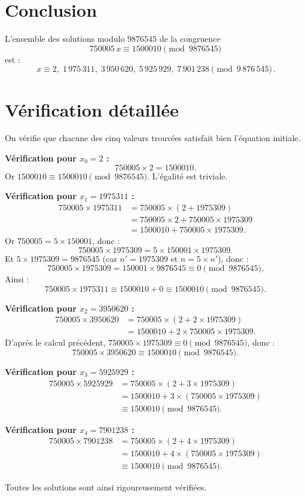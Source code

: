 \documentclass[12pt,a4paper]{article}
\begin{document}
\section*{Conclusion}

L'ensemble des solutions modulo $9876545$ de la congruence
\[
750005\,x \equiv 1500010 \pmod{9876545}
\]
est :
\[
\boxed{\,x \equiv 2,\; 1\,975\,311,\; 3\,950\,620,\; 5\,925\,929,\; 7\,901\,238 \pmod{9\,876\,545}\,}.
\]

\section*{Vérification détaillée}

On vérifie que chacune des cinq valeurs trouvées satisfait bien l'équation initiale.

\medskip
\textbf{Vérification pour $x_0 = 2$ :}
\[
750005 \times 2 = 1500010.
\]
Or $1500010 \equiv 1500010 \pmod{9876545}$. L'égalité est triviale.

\medskip
\textbf{Vérification pour $x_1 = 1975311$ :}
\[
\begin{aligned}
750005 \times 1975311 &= 750005 \times (2 + 1975309) \\
&= 750005 \times 2 + 750005 \times 1975309 \\
&= 1500010 + 750005 \times 1975309.
\end{aligned}
\]
Or $750005 = 5 \times 150001$, donc :
\[
750005 \times 1975309 = 5 \times 150001 \times 1975309.
\]
Et $5 \times 1975309 = 9876545$ (car $n' = 1975309$ et $n = 5 \times n'$), donc :
\[
750005 \times 1975309 = 150001 \times 9876545 \equiv 0 \pmod{9876545}.
\]
Ainsi :
\[
750005 \times 1975311 \equiv 1500010 + 0 \equiv 1500010 \pmod{9876545}.
\]

\medskip
\textbf{Vérification pour $x_2 = 3950620$ :}
\[
\begin{aligned}
750005 \times 3950620 &= 750005 \times (2 + 2 \times 1975309) \\
&= 1500010 + 2 \times 750005 \times 1975309.
\end{aligned}
\]
D'après le calcul précédent, $750005 \times 1975309 \equiv 0 \pmod{9876545}$, donc :
\[
750005 \times 3950620 \equiv 1500010 \pmod{9876545}.
\]

\medskip
\textbf{Vérification pour $x_3 = 5925929$ :}
\[
\begin{aligned}
750005 \times 5925929 &= 750005 \times (2 + 3 \times 1975309) \\
&= 1500010 + 3 \times (750005 \times 1975309) \\
&\equiv 1500010 \pmod{9876545}.
\end{aligned}
\]

\medskip
\textbf{Vérification pour $x_4 = 7901238$ :}
\[
\begin{aligned}
750005 \times 7901238 &= 750005 \times (2 + 4 \times 1975309) \\
&= 1500010 + 4 \times (750005 \times 1975309) \\
&\equiv 1500010 \pmod{9876545}.
\end{aligned}
\]

\medskip
Toutes les solutions sont ainsi rigoureusement vérifiées.
\end{document}
